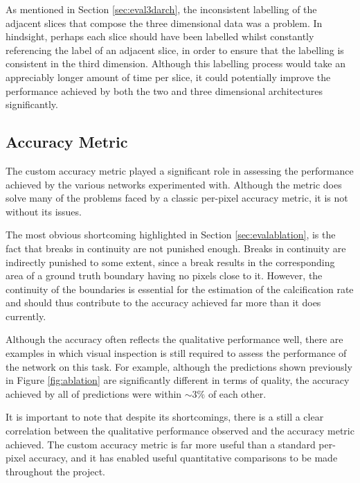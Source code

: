 As mentioned in Section \ref{sec:eval3darch}, the inconsistent labelling of the adjacent slices that compose the three dimensional data was a problem. In hindsight, perhaps each slice should have been labelled whilst constantly referencing the label of an adjacent slice, in order to ensure that the labelling is consistent in the third dimension. Although this labelling process would take an appreciably longer amount of time per slice, it could potentially improve the performance achieved by both the two and three dimensional architectures significantly.

\subsection{Accuracy Metric}
\label{sec:evalaccuracy}

The custom accuracy metric played a significant role in assessing the performance achieved by the various networks experimented with. Although the metric does solve many of the problems faced by a classic per-pixel accuracy metric, it is not without its issues.

The most obvious shortcoming highlighted in Section \ref{sec:evalablation}, is the fact that breaks in continuity are not punished enough. Breaks in continuity are indirectly punished to some extent, since a break results in the corresponding area of a ground truth boundary having no pixels close to it. However, the continuity of the boundaries is essential for the estimation of the calcification rate and should thus contribute to the accuracy achieved far more than it does currently.

Although the accuracy often reflects the qualitative performance well, there are examples in which visual inspection is still required to assess the performance of the network on this task. For example, although the predictions shown previously in Figure \ref{fig:ablation} are significantly different in terms of quality, the accuracy achieved by all of predictions were within ${\sim}3\%$ of each other.

It is important to note that despite its shortcomings, there is a still a clear correlation between the qualitative performance observed and the accuracy metric achieved. The custom accuracy metric is far more useful than a standard per-pixel accuracy, and it has enabled useful quantitative comparisons to be made throughout the project.


